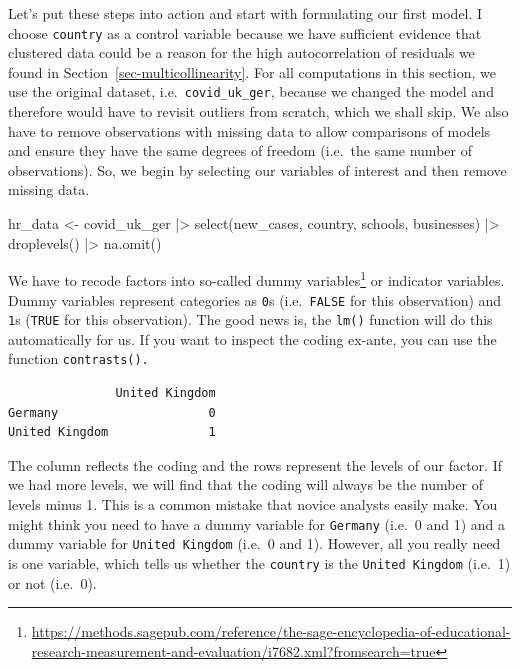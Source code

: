 \documentclass[
  letterpaper,
]{krantz}
\makeatletter
\newenvironment{Shaded}{\begin{snugshade}}{\end{snugshade}}
\newcommand{\FunctionTok}[1]{\textcolor[rgb]{0.28,0.35,0.67}{#1}}
\newcommand{\NormalTok}[1]{\textcolor[rgb]{0.00,0.23,0.31}{#1}}
\newcommand{\OtherTok}[1]{\textcolor[rgb]{0.00,0.23,0.31}{#1}}
\newcommand{\SpecialCharTok}[1]{\textcolor[rgb]{0.37,0.37,0.37}{#1}}
\renewcommand{\href}[2]{#2\footnote{\url{#1}}}
\newenvironment{kframe}{%
\medskip{}
\setlength{\fboxsep}{.8em}
 \def\at@end@of@kframe{}%
 \ifinner\ifhmode%
  \def\at@end@of@kframe{\end{minipage}}%
  \begin{minipage}{\columnwidth}%
 \fi\fi%
 \def\FrameCommand##1{\hskip\@totalleftmargin \hskip-\fboxsep
 \colorbox{shadecolor}{##1}\hskip-\fboxsep
     \hskip-\linewidth \hskip-\@totalleftmargin \hskip\columnwidth}%
 \MakeFramed {\advance\hsize-\width
   \@totalleftmargin\z@ \linewidth\hsize
   \@setminipage}}%
 {\par\unskip\endMakeFramed%
 \at@end@of@kframe}
\renewenvironment{Shaded}{\begin{kframe}}{\end{kframe}}
\makeatother
\begin{document}
Let's put these steps into action and start with formulating our first
model. I choose \texttt{country} as a control variable because we have
sufficient evidence that clustered data could be a reason for the high
autocorrelation of residuals we found in
Section~\ref{sec-multicollinearity}. For all computations in this
section, we use the original dataset, i.e.~\texttt{covid\_uk\_ger},
because we changed the model and therefore would have to revisit
outliers from scratch, which we shall skip. We also have to remove
observations with missing data to allow comparisons of models and ensure
they have the same degrees of freedom (i.e.~the same number of
observations). So, we begin by selecting our variables of interest and
then remove missing data.

\begin{Shaded}
\begin{Highlighting}[]
\NormalTok{hr\_data }\OtherTok{\textless{}{-}}
\NormalTok{  covid\_uk\_ger }\SpecialCharTok{|\textgreater{}}
  \FunctionTok{select}\NormalTok{(new\_cases, country, schools, businesses) }\SpecialCharTok{|\textgreater{}}
  \FunctionTok{droplevels}\NormalTok{() }\SpecialCharTok{|\textgreater{}}
  \FunctionTok{na.omit}\NormalTok{()}
\end{Highlighting}
\end{Shaded}

We have to recode factors into so-called
\href{https://methods.sagepub.com/reference/the-sage-encyclopedia-of-educational-research-measurement-and-evaluation/i7682.xml?fromsearch=true}{dummy
variables} or indicator variables. Dummy variables represent categories
as \texttt{0}s (i.e.~\texttt{FALSE} for this observation) and
\texttt{1}s (\texttt{TRUE} for this observation). The good news is, the
\texttt{lm()} function will do this automatically for us. If you want to
inspect the coding ex-ante, you can use the function
\texttt{contrasts().}

\begin{Shaded}
\end{Shaded}

\begin{verbatim}
               United Kingdom
Germany                     0
United Kingdom              1
\end{verbatim}

The column reflects the coding and the rows represent the levels of our
factor. If we had more levels, we will find that the coding will always
be the number of levels minus 1. This is a common mistake that novice
analysts easily make. You might think you need to have a dummy variable
for \texttt{Germany} (i.e.~0 and 1) and a dummy variable for
\texttt{United\ Kingdom} (i.e.~0 and 1). However, all you really need is
one variable, which tells us whether the \texttt{country} is the
\texttt{United\ Kingdom} (i.e.~1) or not (i.e.~0).
\end{document}
